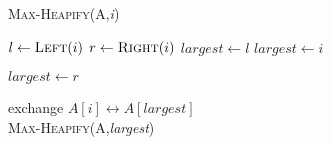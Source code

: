 \documentclass{article}
\begin{document}
\textsc{Max-Heapify}(A,\textit{i})

\begin{algorithmic}

\STATE $l\gets \textsc{Left}(i)$
\STATE $r\gets \textsc{Right}(i)$
\STATE $largest \gets l$
\ELSE
    $largest \gets i$
\ENDIF 

\STATE $largest \gets r$
\ENDIF

\STATE exchange $A[i]\leftrightarrow A[largest]$
\ENDIF \\
\textsc{Max-Heapify}(A,\textit{largest})
\end{algorithmic}
\end{document}
